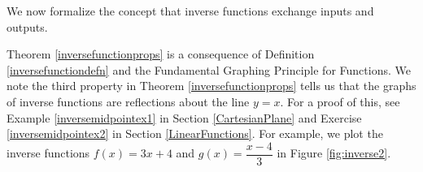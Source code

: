 \smallskip

We now formalize the concept that inverse functions exchange inputs and outputs.
\smallskip


\smallskip

Theorem \ref{inversefunctionprops} is a consequence of Definition \ref{inversefunctiondefn} and the Fundamental Graphing Principle for Functions.  We note the third property in Theorem \ref{inversefunctionprops} tells us that the graphs of inverse functions are reflections about the line $y=x$.  For a proof of this, see Example \ref{inversemidpointex1} in Section \ref{CartesianPlane} and Exercise \ref{inversemidpointex2} in Section \ref{LinearFunctions}.  For example, we plot the inverse functions $f(x) = 3x+4$ and $g(x) = \dfrac{x-4}{3}$ in Figure \ref{fig:inverse2}.




